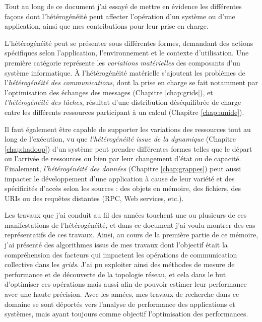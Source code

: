
Tout au long de ce document j'ai essayé de mettre en évidence les différentes façons dont l'hétérogénéité peut affecter l'opération d'un système ou d'une application, ainsi que mes contributions pour leur prise en charge.

L'hétérogénéité peut se présenter sous différentes formes, demandant des actions spécifiques selon l'application, l'environnement et le contexte d'utilisation. Une première catégorie représente les \textit{variations matérielles} des composants d'un système informatique. À l'hétérogénéité matérielle s'ajoutent les problèmes de l'\textit{hétérogénéité des communications}, dont la prise en charge se fait notamment par l'optimisation des échanges des messages (Chapitre \ref{chap:grids}), et \textit{l'hétérogénéité des tâches}, résultat d'une distribution déséquilibrée de charge entre les différents ressources participant à un calcul (Chapitre \ref{chap:amide}). 

Il faut également être capable de supporter les variations des ressources tout au long de l'exécution, vu que \textit{l'hétérogénéité issue de la dynamique} (Chapitre \ref{chap:hadoop}) d'un système peut prendre différentes formes telles que le départ ou l'arrivée de ressources ou bien par leur changement d'état ou de capacité. Finalement, \textit{l'hétérogénéité des données} (Chapitre \ref{chap:grappes}) peut aussi impacter le développement d'une application à cause de leur variété et des spécificités d'accès selon les sources : des objets en mémoire, des fichiers, des URIs ou des requêtes distantes (RPC, Web services, etc.). 

Les travaux que j'ai conduit au fil des années touchent une ou plusieurs de ces manifestations de l'hétérogénéité, et dans ce document j'ai voulu montrer des cas représentatifs de ces travaux. Ainsi, au cours de la première partie de ce mémoire, j'ai présenté des algorithmes issus de mes travaux dont l'objectif était la compréhension des facteurs qui impactent les opérations de communication collective dans les \textit{grids}. J'ai pu exploiter ainsi des méthodes de mesure de performance et de découverte de la topologie réseau, et cela dans le but d'optimiser ces opérations mais aussi afin de pouvoir estimer leur performance avec une haute précision. Avec les années, mes travaux de recherche dans ce domaine se sont déportés vers l'analyse de performance des applications et systèmes, mais ayant toujours comme objectif l'optimisation des performances.

